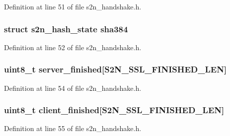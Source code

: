 Definition at line 51 of file s2n\+\_\+handshake.\+h.

\subsubsection[{\texorpdfstring{sha384}{sha384}}]{\setlength{\rightskip}{0pt plus 5cm}struct {\bf s2n\+\_\+hash\+\_\+state} sha384}\hypertarget{structs2n__handshake_a93c2f9ab8a54dcaa33e3b8c9524d6069}{}\label{structs2n__handshake_a93c2f9ab8a54dcaa33e3b8c9524d6069}


Definition at line 52 of file s2n\+\_\+handshake.\+h.

\subsubsection[{\texorpdfstring{server\+\_\+finished}{server_finished}}]{\setlength{\rightskip}{0pt plus 5cm}uint8\+\_\+t server\+\_\+finished\mbox{[}{\bf S2\+N\+\_\+\+S\+S\+L\+\_\+\+F\+I\+N\+I\+S\+H\+E\+D\+\_\+\+L\+EN}\mbox{]}}\hypertarget{structs2n__handshake_a93637661124329bd2a8b9110e00c6766}{}\label{structs2n__handshake_a93637661124329bd2a8b9110e00c6766}


Definition at line 54 of file s2n\+\_\+handshake.\+h.

\subsubsection[{\texorpdfstring{client\+\_\+finished}{client_finished}}]{\setlength{\rightskip}{0pt plus 5cm}uint8\+\_\+t client\+\_\+finished\mbox{[}{\bf S2\+N\+\_\+\+S\+S\+L\+\_\+\+F\+I\+N\+I\+S\+H\+E\+D\+\_\+\+L\+EN}\mbox{]}}\hypertarget{structs2n__handshake_a2855df54edee8fcbca0272bfa74784ca}{}\label{structs2n__handshake_a2855df54edee8fcbca0272bfa74784ca}


Definition at line 55 of file s2n\+\_\+handshake.\+h.

